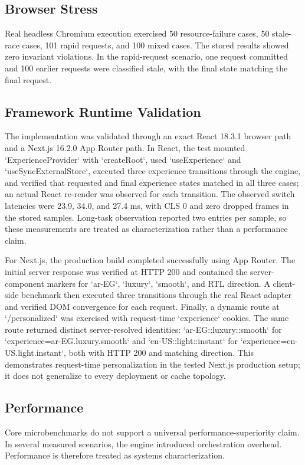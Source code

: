 \documentclass[manuscript]{acmart}
\begin{document}
\subsection{Browser Stress}
Real headless Chromium execution exercised 50 resource-failure cases, 50 stale-race cases,
101 rapid requests, and 100 mixed cases. The stored results showed zero invariant violations.
In the rapid-request scenario, one request committed and 100 earlier requests were classified
stale, with the final state matching the final request.

\subsection{Framework Runtime Validation}
The implementation was validated through an exact React 18.3.1 browser path and a Next.js 16.2.0 App Router path. In React, the test mounted `ExperienceProvider` with `createRoot`, used `useExperience` and `useSyncExternalStore`, executed three experience transitions through the engine, and verified that requested and final experience states matched in all three cases; an actual React re-render was observed for each transition. The observed switch latencies were 23.9, 34.0, and 27.4 ms, with CLS 0 and zero dropped frames in the stored samples. Long-task observation reported two entries per sample, so these measurements are treated as characterization rather than a performance claim.

For Next.js, the production build completed successfully using App Router. The initial server response was verified at HTTP 200 and contained the server-component markers for `ar-EG`, `luxury`, `smooth`, and RTL direction. A client-side benchmark then executed three transitions through the real React adapter and verified DOM convergence for each request. Finally, a dynamic route at `/personalized` was exercised with request-time `experience` cookies. The same route returned distinct server-resolved identities: `ar-EG::luxury::smooth` for `experience=ar-EG.luxury.smooth` and `en-US::light::instant` for `experience=en-US.light.instant`, both with HTTP 200 and matching direction. This demonstrates request-time personalization in the tested Next.js production setup; it does not generalize to every deployment or cache topology.

\subsection{Performance}
Core microbenchmarks do not support a universal performance-superiority claim. In several
measured scenarios, the engine introduced orchestration overhead. Performance is therefore
treated as systems characterization.
\end{document}

